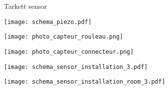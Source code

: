 \begin{frame}{Tarkett sensor}
\begin{minipage}[t]{0.35\linewidth}
\begin{itemize}
    \end{itemize}
\end{minipage}\hfill
\begin{minipage}[t]{0.64\linewidth}
    \vspace{0pt}
    \centering
    \texttt{[image: schema\_piezo.pdf]}\\
    \begin{minipage}[t]{0.49\linewidth}
        \centering
        \texttt{[image: photo\_capteur\_rouleau.png]}\\
    \end{minipage}
    \begin{minipage}[t]{0.49\linewidth}
        \centering
        \texttt{[image: photo\_capteur\_connecteur.png]}\\
    \end{minipage}
    
    \begin{minipage}[b]{0.45\linewidth}
    \centering
    \texttt{[image: schema\_sensor\_installation\_3.pdf]}
    
    \end{minipage}
    \hfill
    \begin{minipage}[b]{0.54\linewidth}
    \centering
    \texttt{[image: schema\_sensor\_installation\_room\_3.pdf]}
    
    \end{minipage}
\end{minipage}

\end{frame}

